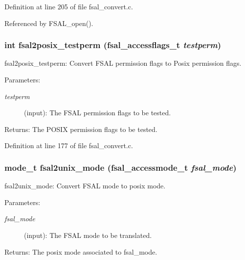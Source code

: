 Definition at line 205 of file fsal\_\-convert.c.

Referenced by FSAL\_\-open().
\subsubsection[{fsal2posix\_\-testperm}]{\setlength{\rightskip}{0pt plus 5cm}int fsal2posix\_\-testperm (fsal\_\-accessflags\_\-t {\em testperm})}\label{fsal__convert_8c_1c6839e19758c2f3a6fa4a75121ce552}


fsal2posix\_\-testperm: Convert FSAL permission flags to Posix permission flags.

\begin{Desc}
\item[Parameters:]
\begin{description}
\item[{\em testperm}](input): The FSAL permission flags to be tested.\end{description}
\end{Desc}
\begin{Desc}
\item[Returns:]The POSIX permission flags to be tested. \end{Desc}


Definition at line 177 of file fsal\_\-convert.c.
\subsubsection[{fsal2unix\_\-mode}]{\setlength{\rightskip}{0pt plus 5cm}mode\_\-t fsal2unix\_\-mode (fsal\_\-accessmode\_\-t {\em fsal\_\-mode})}\label{fsal__convert_8c_d39aceba2aa5bbef96f35a802e463222}


fsal2unix\_\-mode: Convert FSAL mode to posix mode.

\begin{Desc}
\item[Parameters:]
\begin{description}
\item[{\em fsal\_\-mode}](input): The FSAL mode to be translated.\end{description}
\end{Desc}
\begin{Desc}
\item[Returns:]The posix mode associated to fsal\_\-mode. \end{Desc}


